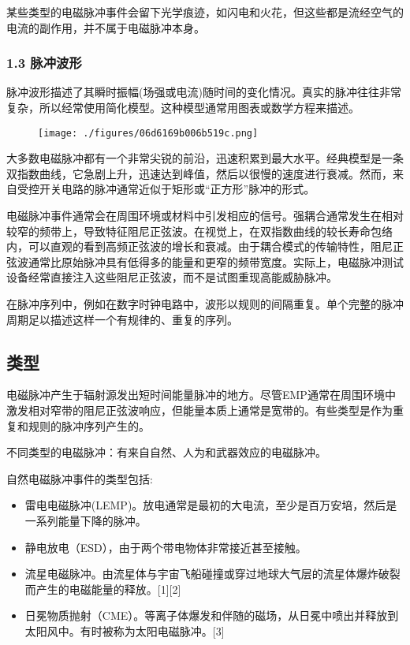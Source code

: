 某些类型的电磁脉冲事件会留下光学痕迹，如闪电和火花，但这些都是流经空气的电流的副作用，并不属于电磁脉冲本身。
\subsubsection{1.3 脉冲波形}
脉冲波形描述了其瞬时振幅(场强或电流)随时间的变化情况。真实的脉冲往往非常复杂，所以经常使用简化模型。这种模型通常用图表或数学方程来描述。
\begin{figure}[ht]
\centering
\texttt{[image: ./figures/06d6169b006b519c.png]}
\caption{} \label{fig_DCMC_1}
\end{figure}
大多数电磁脉冲都有一个非常尖锐的前沿，迅速积累到最大水平。经典模型是一条双指数曲线，它急剧上升，迅速达到峰值，然后以很慢的速度进行衰减。然而，来自受控开关电路的脉冲通常近似于矩形或“正方形”脉冲的形式。

电磁脉冲事件通常会在周围环境或材料中引发相应的信号。强耦合通常发生在相对较窄的频带上，导致特征阻尼正弦波。在视觉上，在双指数曲线的较长寿命包络内，可以直观的看到高频正弦波的增长和衰减。由于耦合模式的传输特性，阻尼正弦波通常比原始脉冲具有低得多的能量和更窄的频带宽度。实际上，电磁脉冲测试设备经常直接注入这些阻尼正弦波，而不是试图重现高能威胁脉冲。

在脉冲序列中，例如在数字时钟电路中，波形以规则的间隔重复。单个完整的脉冲周期足以描述这样一个有规律的、重复的序列。

\subsection{类型}
电磁脉冲产生于辐射源发出短时间能量脉冲的地方。尽管EMP通常在周围环境中激发相对窄带的阻尼正弦波响应，但能量本质上通常是宽带的。有些类型是作为重复和规则的脉冲序列产生的。

不同类型的电磁脉冲：有来自自然、人为和武器效应的电磁脉冲。

自然电磁脉冲事件的类型包括:
\begin{itemize}
\item 雷电电磁脉冲(LEMP)。放电通常是最初的大电流，至少是百万安培，然后是一系列能量下降的脉冲。
\item 静电放电（ESD），由于两个带电物体非常接近甚至接触。
\item 流星电磁脉冲。由流星体与宇宙飞船碰撞或穿过地球大气层的流星体爆炸破裂而产生的电磁能量的释放。[1][2]
\item 日冕物质抛射（CME）。等离子体爆发和伴随的磁场，从日冕中喷出并释放到太阳风中。有时被称为太阳电磁脉冲。[3]
\end{itemize}

